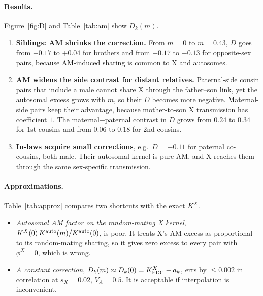 \documentclass[11pt]{article}
\newcommand{\Kx}{K^{X}}
\newcommand{\Ka}{K^{\rm auto}}
\begin{document}
\paragraph{Results.} Figure~\ref{fig:D} and Table~\ref{tab:am} show $D_k(m)$.
\begin{enumerate}
  \item \textbf{Siblings: AM shrinks the correction.} From $m=0$ to $m=0.43$, $D$ goes from $+0.17$ to $+0.04$
    for brothers and from $-0.17$ to $-0.13$ for opposite-sex pairs, because AM-induced sharing is common to X
    and autosomes.
  \item \textbf{AM widens the side contrast for distant relatives.} Paternal-side cousin pairs that include a
    male cannot share X through the father--son link, yet the autosomal excess grows with $m$, so their $D$
    becomes more negative. Maternal-side pairs keep their advantage, because mother-to-son X transmission has
    coefficient $1$. The maternal$-$paternal contrast in $D$ grows from $0.24$ to $0.34$ for 1st cousins and
    from $0.06$ to $0.18$ for 2nd cousins.
  \item \textbf{In-laws acquire small corrections}, e.g.\ $D=-0.11$ for paternal co-cousins, both male. Their
    autosomal kernel is pure AM, and X reaches them through the same sex-specific transmission.
\end{enumerate}

\paragraph{Approximations.} Table~\ref{tab:approx} compares two shortcuts with the exact $\Kx$.
\begin{itemize}
  \item \emph{Autosomal AM factor on the random-mating X kernel},
    $\Kx(0)\,\Ka(m)/\Ka(0)$, is poor. It treats X's AM excess as proportional to its random-mating sharing,
    so it gives zero excess to every pair with $\phi^X=0$, which is wrong.
  \item \emph{A constant correction}, $D_k(m)\approx D_k(0)=\Kx_{\rm FDC}-a_k$, errs by $\le0.002$ in
    correlation at $s_X=0.02$, $V_A=0.5$. It is acceptable if interpolation is inconvenient.
\end{itemize}
\end{document}
